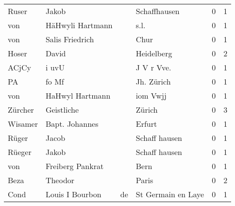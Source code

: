 \begin{center}
\begin{tiny}
\begin{longtabu}{llllrr}
                    Ruser &                              Jakob &             &                                Schaffhausen &          0 &         1 \\
                      von &                   HäHwyli Hartmann &             &                                        s.l. &          0 &         1 \\
                      von &                    Salis Friedrich &             &                                        Chur &          0 &         1 \\
                    Hoser &                              David &             &                                  Heidelberg &          0 &         2 \\
                    ACjCy &                              i uvU &             &                                 J V r Vve.  &          0 &         1 \\
                       PA &                              fo Mf &             &                                  Jh. Zürich &          0 &         1 \\
                      von &                    HaHwyl Hartmann &             &                                    iom Vwjj &          0 &         1 \\
                  Zürcher &                         Geistliche &             &                                      Zürich &          0 &         3 \\
                  Wisamer &                     Bapt. Johannes &             &                                      Erfurt &          0 &         1 \\
                    Rüger &                              Jacob &             &                               Schaff hausen &          0 &         1 \\
                   Rüeger &                              Jakob &             &                               Schaff hausen &          0 &         1 \\
                      von &                   Freiberg Pankrat &             &                                        Bern &          0 &         1 \\
                     Beza &                            Theodor &             &                                       Paris &          0 &         2 \\
                     Cond &                   Louis I  Bourbon &          de &                          St Germain en Laye &          0 &         1 \\

\end{longtabu}
\end{tiny}
\end{center}
